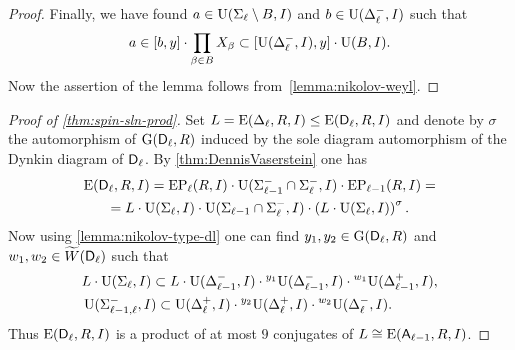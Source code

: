 \begin{proof}
Finally, we have found $a\in\operatorname{U}(\Sigma_\ell\setminus B, I)$ and $b\in\operatorname{U}(\Delta_\ell^-, I)$
such that $$a\in[b,y]\cdot\prod_{\beta\in B}X_\beta\subset[\operatorname{U}(\Delta_\ell^-, I),y]\cdot\operatorname{U}(B, I).$$
Now the assertion of the lemma follows from~\cref{lemma:nikolov-weyl}.
\end{proof}

\begin{proof}[Proof of \cref{thm:spin-sln-prod}]
Set $L = \operatorname{E}(\Delta_\ell, R, I) \leq \operatorname{E}(\mathsf{D}_\ell, R, I)$ and denote by $\sigma$ the automorphism of $\operatorname{G}(\mathsf{D}_\ell, R)$ induced by the sole diagram automorphism of the Dynkin diagram of $\mathsf{D}_\ell$.
By \cref{thm:DennisVaserstein} one has
\begin{multline*}
\operatorname{E}(\mathsf{D}_\ell,R,I) = \operatorname{EP}_{\ell}(R, I)\cdot\operatorname{U}(\Sigma_{\ell-1}^- \cap \Sigma_{\ell}^-, I)\cdot\operatorname{EP}_{\ell-1}(R, I) = \\
= L \cdot\operatorname{U}(\Sigma_{\ell}, I)\cdot\operatorname{U}(\Sigma_{\ell-1} \cap \Sigma_{\ell}^-, I)\cdot \left(L \cdot \operatorname{U}(\Sigma_{\ell}, I) \right)^\sigma.
\end{multline*}  
Now using \cref{lemma:nikolov-type-dl} one can find $y_1,y_2\in\operatorname{G}(\mathsf{D}_\ell,R)$ and $w_1,w_2\in\widetilde{W}(\mathsf{D}_\ell)$ such that
\begin{align*} & L \cdot \operatorname{U}(\Sigma_{\ell}, I) \subset L \cdot \operatorname{U}(\Delta_{\ell-1}^-, I) \cdot {}^{y_1}\!\operatorname{U}(\Delta_{\ell-1}^-, I) \cdot {}^{w_1}\!\operatorname{U}(\Delta_{\ell-1}^+, I), \\
& \operatorname{U}(\Sigma_{\ell-1,\ell}^-, I) \subset \operatorname{U}(\Delta_\ell^+, I) \cdot {}^{y_2}\!\operatorname{U}(\Delta_\ell^+, I) \cdot {}^{w_2}\!\operatorname{U}(\Delta_\ell^-, I). \end{align*} 
Thus $\operatorname{E}(\mathsf{D}_\ell,R,I)$ is a product of at most $9$ conjugates of $L \cong \operatorname{E}(\mathsf{A}_{\ell-1}, R, I)$. \end{proof}